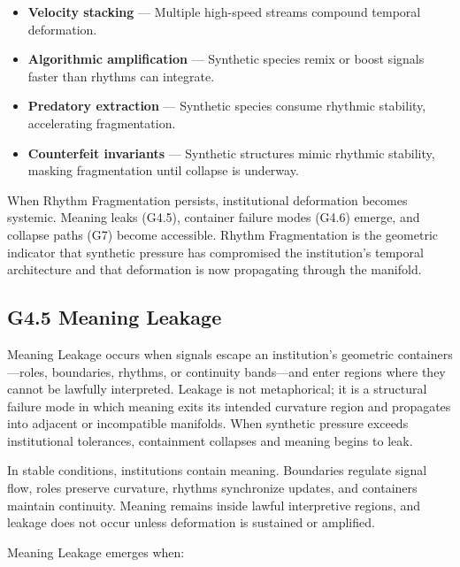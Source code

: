 \begin{itemize}[leftmargin=1.2cm]
    \item \textbf{Velocity stacking} — Multiple high-speed streams compound
    temporal deformation.

    \item \textbf{Algorithmic amplification} — Synthetic species remix or boost
    signals faster than rhythms can integrate.

    \item \textbf{Predatory extraction} — Synthetic species consume rhythmic
    stability, accelerating fragmentation.

    \item \textbf{Counterfeit invariants} — Synthetic structures mimic rhythmic
    stability, masking fragmentation until collapse is underway.
\end{itemize}

\medskip

\noindent When Rhythm Fragmentation persists, institutional deformation becomes
systemic. Meaning leaks (G4.5), container failure modes (G4.6) emerge, and
collapse paths (G7) become accessible. Rhythm Fragmentation is the geometric
indicator that synthetic pressure has compromised the institution’s temporal
architecture and that deformation is now propagating through the manifold.
\subsection*{G4.5 Meaning Leakage}

\noindent Meaning Leakage occurs when signals escape an institution’s geometric
containers—roles, boundaries, rhythms, or continuity bands—and enter regions
where they cannot be lawfully interpreted. Leakage is not metaphorical; it is a
structural failure mode in which meaning exits its intended curvature region and
propagates into adjacent or incompatible manifolds. When synthetic pressure
exceeds institutional tolerances, containment collapses and meaning begins to
leak.

\medskip

\noindent In stable conditions, institutions contain meaning. Boundaries regulate
signal flow, roles preserve curvature, rhythms synchronize updates, and
containers maintain continuity. Meaning remains inside lawful interpretive
regions, and leakage does not occur unless deformation is sustained or
amplified.

\medskip

\noindent Meaning Leakage emerges when:

